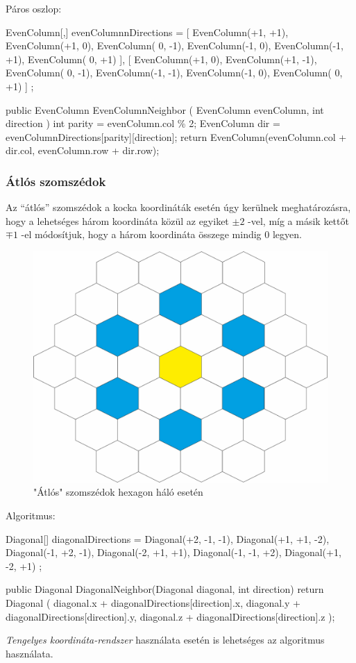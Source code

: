 Páros oszlop: 
\begin{cpp}
EvenColumn[,] evenColumnnDirections = 
{ 
   [ 
      EvenColumn(+1, +1), EvenColumn(+1,  0), EvenColumn( 0, -1),
      EvenColumn(-1,  0), EvenColumn(-1, +1), EvenColumn( 0, +1) 
   ],
   [  
      EvenColumn(+1,  0), EvenColumn(+1, -1), EvenColumn( 0, -1),
      EvenColumn(-1, -1), EvenColumn(-1,  0), EvenColumn( 0, +1) 
   ]
};

public EvenColumn EvenColumnNeighbor
(
   EvenColumn evenColumn, 
   int direction
)
{
   int parity = evenColumn.col \% 2;
   EvenColumn dir = evenColumnDirections[parity][direction];
   return EvenColumn(evenColumn.col + dir.col, evenColumn.row + dir.row);
}   
\end{cpp}

\subsubsection{Átlós szomszédok}

\noindent Az “átlós” szomszédok a kocka koordináták esetén úgy kerülnek meghatározásra, hogy a lehetséges három koordináta közül az egyiket $ \pm 2$ -vel, míg a másik kettőt $\mp 1$ -el módosítjuk, hogy a három koordináta összege mindig $0$ legyen.

\begin{figure}[h!]
\centering
\includegraphics[scale=0.3]{kepek/Diagonals.jpg}
\caption{"Átlós" szomszédok hexagon háló esetén}
\label{fig:Diagonals}
\end{figure}

\noindent Algoritmus:
\begin{cpp}  
Diagonal[] diagonalDirections = 
{ 
   Diagonal(+2, -1, -1), Diagonal(+1, +1, -2), Diagonal(-1, +2, -1), 
   Diagonal(-2, +1, +1), Diagonal(-1, -1, +2), Diagonal(+1, -2, +1)
};

public Diagonal DiagonalNeighbor(Diagonal diagonal, int direction)
{
   return Diagonal
   (
      diagonal.x + diagonalDirections[direction].x, 
      diagonal.y + diagonalDirections[direction].y, 
      diagonal.z + diagonalDirections[direction].z
   );
}         
\end{cpp}

\noindent \textit{Tengelyes koordináta-rendszer} használata esetén is lehetséges az algoritmus használata.